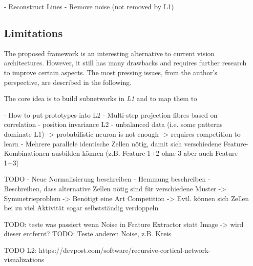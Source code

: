 - Reconstruct Lines
- Remove noise (not removed by L1)



\subsection{Limitations}
The proposed framework is an interesting alternative to current vision architectures.
However, it still has many drawbacks and requires further research to improve certain aspects.
The most pressing issues, from the author's perspective, are described in the following.

The core idea is to build subnetworks in \emph{L1} and to map them to 


- How to put prototypes into L2
- Multi-step projection fibres based on correlation
- position invariance L2
- unbalanced data (i.e. some patterns dominate L1) -> probabilistic neuron is not enough -> requires competition to learn
- Mehrere parallele identische Zellen nötig, damit sich verschiedene Feature-Kombinationen ausbilden können (z.B. Feature 1+2 ohne 3 aber auch Feature 1+3)


TODO
- Neue Normalisierung beschreiben
- Hemmung beschreiben
- Beschreiben, dass alternative Zellen nötig sind für verschiedene Muster -> Symmetrieproblem -> Benötigt eine Art Competition -> Evtl. können sich Zellen bei zu viel Aktivität sogar selbstständig verdoppeln




TODO: teste was passiert wenn Noise in Feature Extractor statt Image -> wird dieser entfernt?
TODO: Teste anderen Noise, z.B. Kreis


TODO L2: https://devpost.com/software/recursive-cortical-network-visualizations